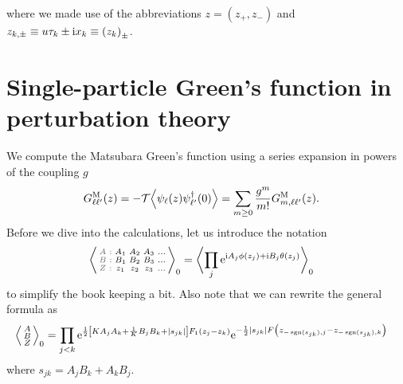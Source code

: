 \documentclass[english, parskip=full]{scrartcl}
\begin{document}
where we made use of the abbreviations $z = (z_+,z_-)$ and $z_{k,\pm} \equiv u\tau_k \pm \i x_k \equiv \kla*{z_k}_\pm$.
\section{Single-particle Green's function in perturbation theory}
We compute the Matsubara Green's function using a series expansion in powers of the coupling $g$
\begin{align}
G_{\ell\ell'}^\M(z) &= -\mathcal{T} \bra*{\psi_\ell(z)\psi_{\ell'}^\dagger(0)} = \sum_{m\ge 0} \frac{g^m}{m!} G_{m,\ell\ell'}^\M(z).
\end{align}
Before we dive into the calculations, let us introduce the notation
\begin{align}
\bra*{\zabx{A_1&A_2&A_3&\dots}{B_1&B_2&B_3&\dots}{z_1&z_2&z_3&\dots}}_0 &= \bra[\bigg]{\prod_j \powe{\i A_j\phi(z_j) + \i B_j\theta(z_j)}}_0
\end{align}
to simplify the book keeping a bit.
Also note that we can rewrite the general formula as
\begin{align}
\bra*{\abx{A}{B}{Z}}_0 &= \prod_{j<k} \powe{\frac{1}{2}\klb*{KA_jA_k + \frac{1}{K}B_jB_k + \abs*{s_{jk}}}F_1(z_j-z_k)} \powe{-\frac{1}{2}|s_{jk}| F\kla*{z_{-\sgn(s_{jk}),j} - z_{-\sgn(s_{jk}), k}}}
\end{align}
where $s_{jk} = A_jB_k+A_kB_j$.
\end{document}
